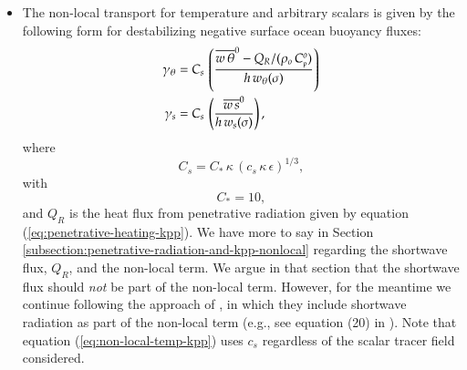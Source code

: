 \begin{itemize}
\item The non-local transport for temperature and arbitrary scalars is
  given by the following form for destabilizing negative surface ocean
  buoyancy fluxes:
\begin{align}
 \gamma_{\theta} &= 
   C_{s} \, \left( \frac{ \overline{w \, \theta}^{0} - Q_{R}/(\rho_{o} \, C_{\mbox{\tiny p}}^{o})  }{h \,  w_{\theta}(\sigma)}  
            \right) 
\label{eq:non-local-temp-kpp}
\\
 \gamma_{s} &= 
   C_{s} \, \left( \frac{ \overline{w \, s}^{0} }{h \,  w_{s}(\sigma)}  
            \right), 
\label{eq:non-local-scalar-kpp}
\end{align}
 where 
\begin{equation}
 C_{s} = C_{*} \, \kappa \, (c_{s} \, \kappa \, \epsilon)^{1/3},  
\label{eq:cs-and-cstar-defined}
\end{equation}
with 
\begin{equation}
 C_{*} = 10,
\label{eq:cstar-value-specified}
\end{equation}
and $Q_{R}$ is the heat flux from penetrative radiation given by
equation (\ref{eq:penetrative-heating-kpp}).  We have more to say in
Section \ref{subsection:penetrative-radiation-and-kpp-nonlocal}
regarding the shortwave flux, $Q_{R}$, and the non-local term.  We
argue in that section that the shortwave flux should {\it not} be part
of the non-local term.  However, for the meantime we continue
following the approach of \cite{LargeKPP}, in which they include
shortwave radiation as part of the non-local term (e.g., see equation
(20) in \cite{LargeKPP}).  Note that equation
(\ref{eq:non-local-temp-kpp}) uses $c_{s}$ regardless of the scalar
tracer field considered.


\end{itemize}
